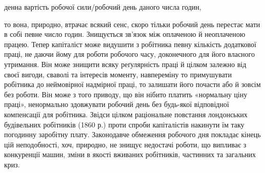 денна вартість робочої сили/робочий день даного числа годин,

то вона, природно, втрачає всякий сенс, скоро тільки робочий
день перестає мати в собі певне число годин. Знищується зв’язок
між оплаченою й неоплаченою працею. Тепер капіталіст може
видушити з робітника певну кількість додаткової праці, не даючи
йому для роботи робочого часу, доконечного для його власного
утримання. Він може знищити всяку реґулярність праці й цілком
залежно від своєї вигоди, сваволі та інтересів моменту, навпереміну
то примушувати робітника до неймовірної надмірної
праці, то залишати його почасти або й зовсім без роботи. Він
може з того приводу, що він нібито платить «нормальну ціну
праці», ненормально здовжувати робочий день без будь-якої відповідної
компенсації для робітника. Звідси цілком раціональне
повстання лондонських будівельних робітників (1860 р.) проти
спроби капіталістів накинути їм таку погодинну заробітну плату.
Законодавче обмеження робочого дня покладає кінець цій неподобності,
хоч, природно, не знищує недостачі роботи, що випливає
з конкуренції машин, зміни в якості вживаних робітників,
частинних та загальних криз.

